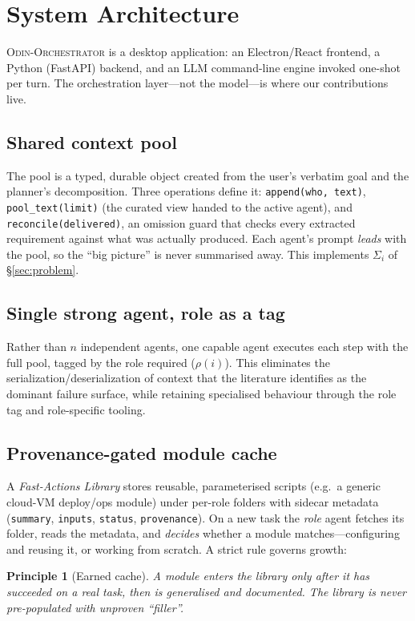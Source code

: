 \documentclass[10pt,twocolumn]{article}
\newtheorem{principle}{Principle}
\begin{document}
\section{System Architecture}\label{sec:arch}
\textsc{Odin-Orchestrator} is a desktop application: an Electron/React frontend,
a Python (FastAPI) backend, and an LLM command-line engine invoked
one-shot per turn. The orchestration layer---not the model---is where our
contributions live.

\subsection{Shared context pool}
The pool is a typed, durable object created from the user's verbatim goal and
the planner's decomposition. Three operations define it:
\texttt{append(who, text)}, \texttt{pool\_text(limit)} (the curated view handed
to the active agent), and \texttt{reconcile(delivered)}, an omission guard that
checks every extracted requirement against what was actually produced. Each
agent's prompt \emph{leads} with the pool, so the ``big picture'' is never
summarised away. This implements $\Sigma_i$ of \S\ref{sec:problem}.

\subsection{Single strong agent, role as a tag}
Rather than $n$ independent agents, one capable agent executes each step with
the full pool, tagged by the role required ($\rho(i)$). This eliminates the
serialization/deserialization of context that the literature identifies as the
dominant failure surface, while retaining specialised behaviour through the
role tag and role-specific tooling.

\subsection{Provenance-gated module cache}
A \emph{Fast-Actions Library} stores reusable, parameterised scripts (e.g.\ a
generic cloud-VM deploy/ops module) under per-role folders with sidecar
metadata (\texttt{summary}, \texttt{inputs}, \texttt{status},
\texttt{provenance}). On a new task the \emph{role} agent fetches its folder,
reads the metadata, and \emph{decides} whether a module matches---configuring
and reusing it, or working from scratch. A strict rule governs growth:

\begin{principle}[Earned cache]\label{prin:cache}
A module enters the library \emph{only after} it has succeeded on a real task,
then is generalised and documented. The library is never pre-populated with
unproven ``filler''.
\end{principle}
\end{document}

